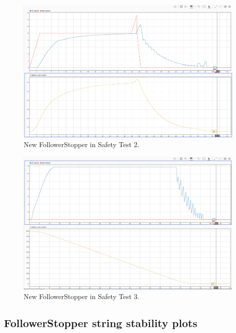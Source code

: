 \documentclass[conference]{IEEEtran}
\begin{document}
\begin{appendix}
\begin{figure}[htbp]
\centerline{\includegraphics[width=5.71 in]{newFS_safety2.PNG}}
\caption{New FollowerStopper in Safety Test 2.}
\label{newsafe2}
\end{figure}

\begin{figure}[htbp]
\centerline{\includegraphics[width=5.71 in]{newFS_safety3.PNG}}
\caption{New FollowerStopper in Safety Test 3.}
\label{newsafe3}
\end{figure}


\pagebreak
\subsection{FollowerStopper string stability plots}


\end{appendix}
\end{document}
